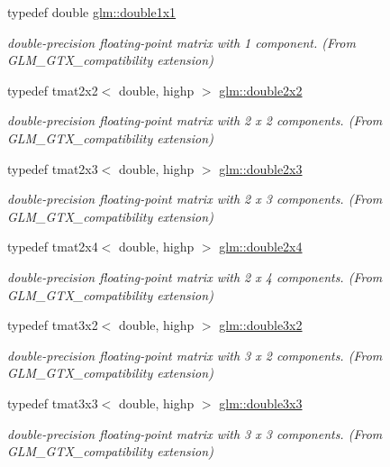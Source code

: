 \begin{DoxyCompactItemize}
typedef double \hyperlink{group__gtx__compatibility_ga1c87d3042377335eb050a20ab0ec148a}{glm\+::double1x1}
\begin{DoxyCompactList}\small\item\em double-\/precision floating-\/point matrix with 1 component. (From G\+L\+M\+\_\+\+G\+T\+X\+\_\+compatibility extension) \end{DoxyCompactList}\item 
typedef tmat2x2$<$ double, highp $>$ \hyperlink{group__gtx__compatibility_ga7651d80f2dcc222a2e229ce44af96f11}{glm\+::double2x2}
\begin{DoxyCompactList}\small\item\em double-\/precision floating-\/point matrix with 2 x 2 components. (From G\+L\+M\+\_\+\+G\+T\+X\+\_\+compatibility extension) \end{DoxyCompactList}\item 
typedef tmat2x3$<$ double, highp $>$ \hyperlink{group__gtx__compatibility_ga60ae0f5858d498b2e5b9bb8d23019db0}{glm\+::double2x3}
\begin{DoxyCompactList}\small\item\em double-\/precision floating-\/point matrix with 2 x 3 components. (From G\+L\+M\+\_\+\+G\+T\+X\+\_\+compatibility extension) \end{DoxyCompactList}\item 
typedef tmat2x4$<$ double, highp $>$ \hyperlink{group__gtx__compatibility_gadb90656f5faac0e800718a0a19bf0e03}{glm\+::double2x4}
\begin{DoxyCompactList}\small\item\em double-\/precision floating-\/point matrix with 2 x 4 components. (From G\+L\+M\+\_\+\+G\+T\+X\+\_\+compatibility extension) \end{DoxyCompactList}\item 
typedef tmat3x2$<$ double, highp $>$ \hyperlink{group__gtx__compatibility_ga00e4b55452fdffa224a68ead4edffa5a}{glm\+::double3x2}
\begin{DoxyCompactList}\small\item\em double-\/precision floating-\/point matrix with 3 x 2 components. (From G\+L\+M\+\_\+\+G\+T\+X\+\_\+compatibility extension) \end{DoxyCompactList}\item 
typedef tmat3x3$<$ double, highp $>$ \hyperlink{group__gtx__compatibility_ga3bcec888e1dca957b39c2213b740ff21}{glm\+::double3x3}
\begin{DoxyCompactList}\small\item\em double-\/precision floating-\/point matrix with 3 x 3 components. (From G\+L\+M\+\_\+\+G\+T\+X\+\_\+compatibility extension) \end{DoxyCompactList}\item 

\end{DoxyCompactItemize}
